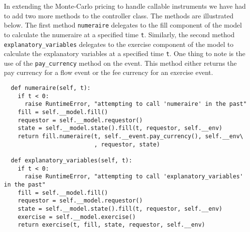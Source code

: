 In extending the Monte-Carlo pricing to handle callable instruments we
have had to add two more methods to the controller class. The methods
are illustrated below. The first method \verb|numeraire| delegates to
the fill component of the model to calculate the numeraire at a
specified time \verb|t|. Similarly, the second method
\verb|explanatory_variables| delegates to the exercise component of
the model to calculate the explanatory variables at a specified time
\verb|t|. One thing to note is the use of the \verb|pay_currency|
method on the event. This method either returns the pay currency for a
flow event or the fee currency for an exercise event.
\begin{verbatim}
  def numeraire(self, t):
    if t < 0:
      raise RuntimeError, "attempting to call 'numeraire' in the past"
    fill = self.__model.fill()
    requestor = self.__model.requestor()
    state = self.__model.state().fill(t, requestor, self.__env)
    return fill.numeraire(t, self.__event.pay_currency(), self.__env\
                          , requestor, state)

  def explanatory_variables(self, t):
    if t < 0:
      raise RuntimeError, "attempting to call 'explanatory_variables' in the past"
    fill = self.__model.fill()
    requestor = self.__model.requestor()
    state = self.__model.state().fill(t, requestor, self.__env)
    exercise = self.__model.exercise()
    return exercise(t, fill, state, requestor, self.__env)
\end{verbatim}

